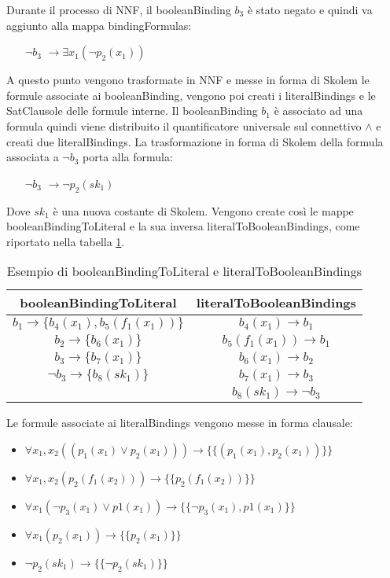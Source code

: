 \documentclass[./main.tex]{subfiles}
\begin{document}
Durante il processo di NNF, il booleanBinding $b_3$ è stato negato e quindi va aggiunto alla mappa bindingFormulas:

\begin{itemize}
    \item [$\lnot b_3$] $\rightarrow \exists x_1(\lnot p_2(x_1))$
\end{itemize}

A questo punto vengono trasformate in NNF e messe in forma di Skolem le formule associate ai booleanBinding,
vengono poi creati i literalBindings e le SatClausole delle formule interne.
Il booleanBinding $b_1$ è associato ad una formula \cb quindi 
viene distribuito il quantificatore universale sul connettivo $\land$ e creati due literalBindings.
La trasformazione in forma di Skolem della formula associata a $\lnot b_3$ porta alla formula:
\begin{itemize}
    \item [$\lnot b_3$] $\rightarrow \lnot p_2(sk_1)$
\end{itemize}
Dove $sk_1$ è una nuova costante di Skolem. 
Vengono create così le mappe booleanBindingToLiteral e la sua inversa literalToBooleanBindings,
come riportato nella tabella \ref{tab:bindingToLiteral}.

\begin{table}[H]
    \label{tab:bindingToLiteral}
    \caption{Esempio di booleanBindingToLiteral e literalToBooleanBindings}
    \centering
    \begin{tabular}{|c|c|}
        \hline
        \textbf{booleanBindingToLiteral} & \textbf{literalToBooleanBindings} \\
        \hline
        $b_1 \rightarrow \{b_4(x_1), b_5(f_1(x_1))\}$ & $b_4(x_1) \rightarrow b_1$\\
        $b_2 \rightarrow \{b_6(x_1)\}$ & $b_5(f_1(x_1)) \rightarrow b_1$ \\
        $b_3 \rightarrow \{b_7(x_1)\}$ & $b_6(x_1) \rightarrow b_2$ \\
        $\lnot b_3 \rightarrow \{b_8(sk_1)\}$ & $b_7(x_1) \rightarrow b_3$ \\
        & $b_8(sk_1) \rightarrow \lnot b_3$ \\
        \hline
    \end{tabular}
\end{table}

Le formule associate ai literalBindings vengono messe in forma clausale:

\begin{itemize}
    \item $\forall x_1, x_2 ((p_1(x_1) \lor p_2(x_1))) \rightarrow \{\{(p_1(x_1), p_2(x_1))\}\}$
    \item $\forall x_1, x_2 (p_2(f_1(x_2))) \rightarrow \{\{p_2(f_1(x_2))\}\}$
    \item $\forall x_1 (\lnot p_3(x_1) \lor p1(x_1)) \rightarrow \{\{\lnot p_3(x_1), p1(x_1)\}\}$
    \item $\forall x_1(p_2(x_1)) \rightarrow \{\{p_2(x_1)\}\}$
    \item $\lnot p_2(sk_1) \rightarrow \{\{\lnot p_2(sk_1)\}\}$
\end{itemize}
\end{document}
